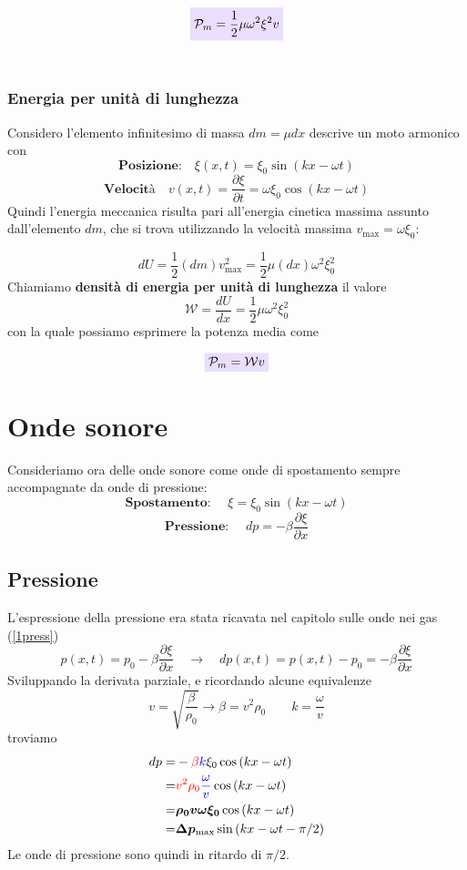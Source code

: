 \documentclass[x11names]{report}
\newcommand{\viola}[1]{\colorbox{yred}{$\displaystyle #1$}}
\begin{document}
	\begin{equation}
		\viola{\mathcal{P}_m = \frac{1}{2}\mu\omega^2\xi^2v}
	\end{equation}
	\\
	
	\subsubsection{Energia per unità di lunghezza}
	Considero l'elemento infinitesimo di massa \(dm = \mu dx \) descrive un moto armonico con 
	\[ 
	\textbf{Posizione:} \quad \xi(x,t) = \xi_0\sin\left(kx - \omega t\right) 
	\]
	\[ 
	\textbf{Velocità} \quad v(x,t)= \frac{\partial\xi}{\partial t} = \omega \xi_0\cos\left(kx - \omega t\right) 
	\]
	Quindi l'energia meccanica risulta pari all'energia cinetica massima assunto dall'elemento \(dm\), che si trova utilizzando la velocità massima \(v_{\text{max}} = \omega \xi_0\):
	
	\[ 
	dU = \frac{1}{2}(dm)v_{\text{max}}^2 = \frac{1}{2}\mu(dx)\omega^2 \xi_0^2 
	\]
	Chiamiamo \textbf{densità di energia per unità di lunghezza} il valore 
	\[
	\mathcal{W} = \frac{dU}{dx} = \frac{1}{2}\mu \omega^2\xi_0^2
	\]
	con la quale possiamo esprimere la potenza media come 
	
	\begin{equation}
		\viola{\mathcal{P}_m = \mathcal{W} v}
	\end{equation}
	
	\section{Onde sonore}\label{Onde Sonore}
	Consideriamo ora delle onde sonore come onde di spostamento sempre accompagnate da onde di pressione:
	\[ 
	\textbf{Spostamento: }\quad \xi = \xi _0\sin(kx-\omega t)
	\]
	\[ 
	\textbf{Pressione: }\quad dp = -\beta \frac{\partial\xi}{\partial x}
	\]
	\subsection{Pressione}
	L'espressione della pressione era stata ricavata nel capitolo sulle onde nei gas (\ref{1press})
	\[ 
	p(x,t) = p_0 -\beta \frac{\partial \xi }{\partial x} \quad \to \quad dp(x,t) = p(x,t) - p_0 = -\beta \frac{\partial \xi }{\partial x}
	\]
	Sviluppando la derivata parziale, e ricordando alcune equivalenze
	\[ 
	\boxed{v = \sqrt{\frac{\beta}{\rho_0}} \to  \beta = v^2\rho_0} \qquad \boxed{k = \frac{\omega }{v}}
	\]
	troviamo
	\begin{align*}
		dp =& -\textcolor{red}{\beta} \textcolor{blue}{k} \xi_0 \cos\left(kx-\omega t\right) \\
		=& \textcolor{red}{v^2 \rho_0}\textcolor{blue}{\frac{\omega }{v}} \cos\left(kx-\omega t\right) \\
		=& \boldsymbol{\rho_0 v \omega  \xi_0}  \cos\left(kx-\omega t\right) \\ 
		=& \boldsymbol{\Delta p_{\text{max}}} \sin\left(kx -\omega t - \pi /2\right) \\
	\end{align*}
	Le onde di pressione sono quindi in ritardo di \(\pi /2\).
	
\end{document}
